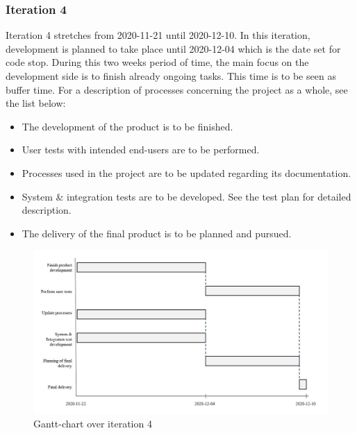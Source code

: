 \subsubsection{Iteration 4}
Iteration 4 stretches from 2020-11-21 until 2020-12-10. In this iteration, development is planned to take place until 2020-12-04 which is the date set for code stop. During this two weeks period of time, the main focus on the development side is to finish already ongoing tasks. This time is to be seen as buffer time. For a description of processes concerning the project as a whole, see the list below:
\begin{itemize}
    \item The development of the product is to be finished. 
    \item User tests with intended end-users are to be performed.
    \item Processes used in the project are to be updated regarding its documentation. 
    \item System \& integration tests are to be developed. See the test plan for detailed description.
    \item The delivery of the final product is to be planned and pursued. 
\end{itemize}

\begin{figure}[H]
\centering
\includegraphics[width=\linewidth]{Pictures/iteration_4.JPG}
\caption{Gantt-chart over iteration 4}
\label{fig:iteration_4}
\end{figure}

